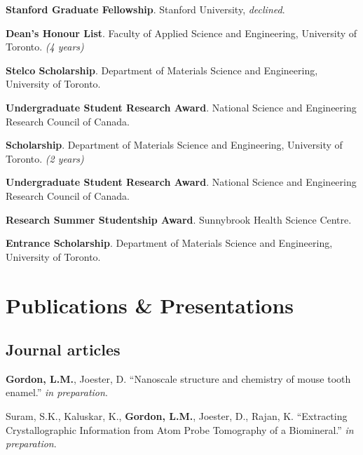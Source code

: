 \textbf{Stanford Graduate Fellowship}. Stanford University, \emph{declined}.

\textbf{Dean's Honour List}. Faculty of Applied Science and Engineering, University of Toronto. \emph{(4 years)}

\textbf{Stelco Scholarship}. Department of Materials Science and Engineering, University of Toronto.

\textbf{Undergraduate Student Research Award}. National Science and Engineering Research Council of Canada. 

\textbf{Scholarship}. Department of Materials Science and Engineering, University of Toronto. \emph{(2 years)}

\textbf{Undergraduate Student Research Award}. National Science and Engineering Research Council of Canada. 

\textbf{Research Summer Studentship Award}. Sunnybrook Health Science Centre.

\textbf{Entrance Scholarship}. Department of Materials Science and Engineering, University of Toronto.
\endgroup

\section*{Publications \& Presentations}



\subsection*{Journal articles}
\textbf{Gordon, L.M.}, Joester, D. “Nanoscale structure and chemistry of mouse tooth enamel.” \emph{in preparation}.

\begingroup\setlength{\parskip}{0.15cm}
Suram, S.K., Kaluskar, K., \textbf{Gordon, L.M.}, Joester, D., Rajan, K. “Extracting Crystallographic Information from Atom Probe Tomography of a Biomineral.” \emph{in preparation}.

